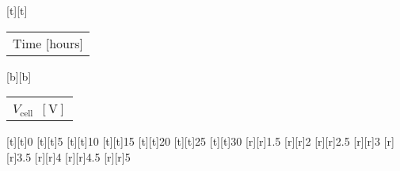 %    
%
%
%
[t][t]{\color[rgb]{0,0,0}\setlength{\tabcolsep}{0pt}\begin{tabular}{c}Time [hours]\end{tabular}}%
[b][b]{\color[rgb]{0,0,0}\setlength{\tabcolsep}{0pt}\begin{tabular}{c}$V_\text{cell}$\ $[\text{V}]$\end{tabular}}%
%
[t][t]{0}%
[t][t]{5}%
[t][t]{10}%
[t][t]{15}%
[t][t]{20}%
[t][t]{25}%
[t][t]{30}%
%
[r][r]{1.5}%
[r][r]{2}%
[r][r]{2.5}%
[r][r]{3}%
[r][r]{3.5}%
[r][r]{4}%
[r][r]{4.5}%
[r][r]{5}%
%
%
